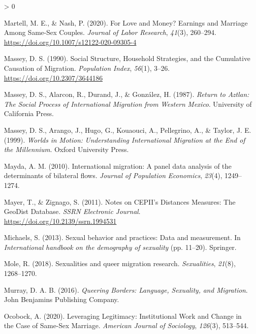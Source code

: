 \documentclass[
  11pt,
]{article}
\newlength{\cslhangindent}
\newenvironment{CSLReferences}[2] %
 {%
  \setlength{\parindent}{0pt}
  \ifodd #1 \everypar{\setlength{\hangindent}{\cslhangindent}}\ignorespaces\fi
  \ifnum #2 > 0
  \setlength{\parskip}{#2\baselineskip}
  \fi
 }%
 {}
\begin{document}
\begin{CSLReferences}{1}{0}
\leavevmode\hypertarget{ref-martell_2020}{}%
Martell, M. E., \& Nash, P. (2020). For {Love} and {Money}? {Earnings} and {Marriage Among Same}-{Sex Couples}. \emph{Journal of Labor Research}, \emph{41}(3), 260--294. \url{https://doi.org/10.1007/s12122-020-09305-4}

\leavevmode\hypertarget{ref-massey_1990_social}{}%
Massey, D. S. (1990). Social {Structure}, {Household Strategies}, and the {Cumulative Causation} of {Migration}. \emph{Population Index}, \emph{56}(1), 3--26. \url{https://doi.org/10.2307/3644186}

\leavevmode\hypertarget{ref-massey_1987}{}%
Massey, D. S., Alarcon, R., Durand, J., \& González, H. (1987). \emph{Return to {Aztlan}: {The Social Process} of {International Migration} from {Western Mexico}}. {University of California Press}.

\leavevmode\hypertarget{ref-massey_1999}{}%
Massey, D. S., Arango, J., Hugo, G., Kouaouci, A., Pellegrino, A., \& Taylor, J. E. (1999). \emph{Worlds in {Motion}: {Understanding International Migration} at the {End} of the {Millennium}}. {Oxford University Press}.

\leavevmode\hypertarget{ref-mayda_2010}{}%
Mayda, A. M. (2010). International migration: A panel data analysis of the determinants of bilateral flows. \emph{Journal of Population Economics}, \emph{23}(4), 1249--1274.

\leavevmode\hypertarget{ref-mayer_2011}{}%
Mayer, T., \& Zignago, S. (2011). Notes on {CEPII}'s {Distances Measures}: {The GeoDist Database}. \emph{SSRN Electronic Journal}. \url{https://doi.org/10.2139/ssrn.1994531}

\leavevmode\hypertarget{ref-michaels_2013}{}%
Michaels, S. (2013). Sexual behavior and practices: {Data} and measurement. In \emph{International handbook on the demography of sexuality} (pp. 11--20). {Springer}.

\leavevmode\hypertarget{ref-mole_2018a}{}%
Mole, R. (2018). Sexualities and queer migration research. \emph{Sexualities}, \emph{21}(8), 1268--1270.

\leavevmode\hypertarget{ref-murray_2016}{}%
Murray, D. A. B. (2016). \emph{Queering {Borders}: {Language}, {Sexuality}, and {Migration}}. {John Benjamins Publishing Company}.

\leavevmode\hypertarget{ref-ocobock_2020_leveraging}{}%
Ocobock, A. (2020). Leveraging {Legitimacy}: {Institutional Work} and {Change} in the {Case} of {Same}-{Sex Marriage}. \emph{American Journal of Sociology}, \emph{126}(3), 513--544.


\end{CSLReferences}
\end{document}
